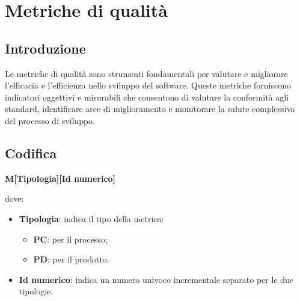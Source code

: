 
\newcommand{\MPC}[2]{
    \refstepcounter{M}
    \subsubsection{MPC\arabic{M} - #1}\label{M:#2}
    }
\newcommand{\MPD}[2]{
    \refstepcounter{M}
    \subsubsection{MPD\arabic{M} - #1}\label{M:#2}
}
\section{Metriche di qualità}
\subsection{Introduzione}
Le metriche di qualità sono strumenti fondamentali per
valutare e migliorare l’efficacia e l’efficienza nello sviluppo del software. Queste metriche
forniscono indicatori oggettivi e misurabili che consentono di valutare la conformità agli
standard, identificare aree di miglioramento e monitorare la salute complessiva del processo
di sviluppo.
\subsection*{Codifica}
\begin{center}
    \textbf{M[Tipologia][Id numerico]}
\end{center}
dove:
\begin{itemize}
    \item \textbf{Tipologia}: indica il tipo della metrica:
    \begin{itemize}
        \item \textbf{PC}: per il processo;
        \item \textbf{PD}: per il prodotto.
    \end{itemize}
    \item \textbf{Id numerico}: indica un numero univoco incrementale separato per le due tipologie.
\end{itemize}


